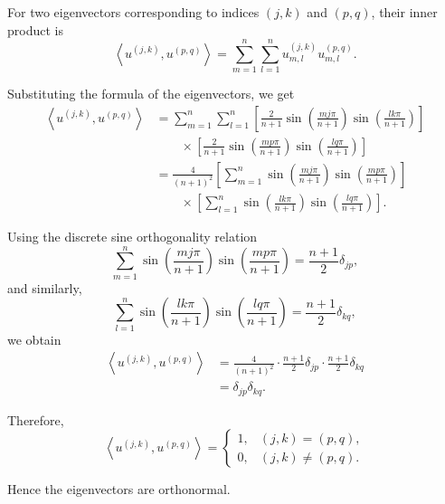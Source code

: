 \documentclass{ctexart}
\begin{document}
\begin{solution}
  For two eigenvectors corresponding to indices $(j,k)$ and $(p,q)$, their
  inner product is
  \[
    \left\langle u^{(j,k)},u^{(p,q)} \right\rangle
    =
    \sum_{m=1}^n \sum_{l=1}^n
    u_{m,l}^{(j,k)} u_{m,l}^{(p,q)} .
  \]

  Substituting the formula of the eigenvectors, we get
  \[
    \begin{aligned}
      \left\langle u^{(j,k)},u^{(p,q)} \right\rangle
      &=
      \sum_{m=1}^n \sum_{l=1}^n
      \left[
        \frac{2}{n+1}
        \sin\left(\frac{mj\pi}{n+1}\right)
        \sin\left(\frac{lk\pi}{n+1}\right)
      \right]
      \\
      &\qquad \times
      \left[
        \frac{2}{n+1}
        \sin\left(\frac{mp\pi}{n+1}\right)
        \sin\left(\frac{lq\pi}{n+1}\right)
      \right]  \\
      &=
      \frac{4}{(n+1)^2}
      \left[
        \sum_{m=1}^n
        \sin\left(\frac{mj\pi}{n+1}\right)
        \sin\left(\frac{mp\pi}{n+1}\right)
      \right]
      \\
      &\qquad \times
      \left[
        \sum_{l=1}^n
        \sin\left(\frac{lk\pi}{n+1}\right)
        \sin\left(\frac{lq\pi}{n+1}\right)
      \right].
    \end{aligned}
  \]

  Using the discrete sine orthogonality relation
  \[
    \sum_{m=1}^n
    \sin\left(\frac{mj\pi}{n+1}\right)
    \sin\left(\frac{mp\pi}{n+1}\right)
    =
    \frac{n+1}{2}\delta_{jp},
  \]
  and similarly,
  \[
    \sum_{l=1}^n
    \sin\left(\frac{lk\pi}{n+1}\right)
    \sin\left(\frac{lq\pi}{n+1}\right)
    =
    \frac{n+1}{2}\delta_{kq},
  \]
  we obtain
  \[
    \begin{aligned}
      \left\langle u^{(j,k)},u^{(p,q)} \right\rangle
      &=
      \frac{4}{(n+1)^2}
      \cdot
      \frac{n+1}{2}\delta_{jp}
      \cdot
      \frac{n+1}{2}\delta_{kq}  \\
      &=
      \delta_{jp}\delta_{kq}.
    \end{aligned}
  \]

  Therefore,
  \[
    \left\langle u^{(j,k)},u^{(p,q)} \right\rangle
    =
    \begin{cases}
      1, & (j,k)=(p,q),\\
      0, & (j,k)\neq(p,q).
    \end{cases}
  \]

  Hence the eigenvectors are orthonormal.
\end{solution}
\end{document}
